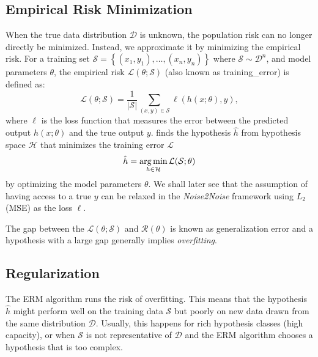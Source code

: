 \subsection{Empirical Risk Minimization}\label{sec:erm}
When the true data distribution $\mathcal{D}$ is unknown, the population risk can no longer directly be minimized. Instead, we approximate it by minimizing the empirical risk. For a training set $\mathcal{S} = \left\{ (x_1, y_1), \ldots, (x_n, y_n) \right\}$ where $\mathcal{S} \sim \mathcal{D}^n$, and model parameters $\theta$, the empirical risk $\mathcal{L}(\theta; \mathcal{S})$ (also known as \gls{training_error}) is defined as:
\begin{equation}
    \mathcal{L}(\theta; \mathcal{S}) = \frac{1}{\lvert \mathcal{S} \rvert} \sum_{(x, y) \in \mathcal{S}} \ell(h(x; \theta), y),
\end{equation}
where $\ell$ is the loss function that measures the error between the predicted output $h(x; \theta)$ and the true output $y$.  finds the hypothesis $\hat{h}$ from hypothesis space $\mathcal{H}$ that minimizes the training error $\mathcal{L}$
\begin{equation}\label{eq:erm}
    \hat{h} = \operatorname*{arg\,min}_{h \in \mathcal{H}} \mathcal{L}(\mathcal{S};\theta)
\end{equation}
by optimizing the model parameters $\theta$.
We shall later see that the assumption of having access to a true $y$ can be relaxed in the \textit{Noise2Noise} framework using $L_2$ (\gls{MSE}) as the loss $\ell$.

The gap between the $\mathcal{L}(\theta; \mathcal{S})$ and $\mathcal{R}(\theta)$ is known as generalization error and a hypothesis with a large gap generally implies \textit{overfitting}.

\subsection{Regularization}
The \gls{ERM} algorithm runs the risk of overfitting. This means that the hypothesis $\hat{h}$ might perform well on the training data $\mathcal{S}$ but poorly on new data drawn from the same distribution $\mathcal{D}$. Usually, this happens for rich hypothesis classes (high capacity), or when $\mathcal{S}$ is not representative of $\mathcal{D}$ and the \gls{ERM} algorithm chooses a hypothesis that is too complex. 

